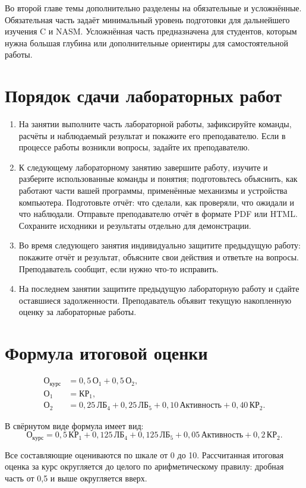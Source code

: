 Во второй главе темы дополнительно разделены на обязательные и усложнённые. Обязательная часть задаёт минимальный уровень подготовки для дальнейшего изучения C и NASM. Усложнённая часть предназначена для студентов, которым нужна большая глубина или дополнительные ориентиры для самостоятельной работы.

\section*{Порядок сдачи лабораторных работ}

\begin{enumerate}
    \item На занятии выполните часть лабораторной работы, зафиксируйте команды, расчёты и наблюдаемый результат и покажите его преподавателю. Если в процессе работы возникли вопросы, задайте их преподавателю.
    \item К следующему лабораторному занятию завершите работу, изучите и разберите использованные команды и понятия; подготовьтесь объяснить, как работают части вашей программы, применённые механизмы и устройства компьютера. Подготовьте отчёт: что сделали, как проверяли, что ожидали и что наблюдали. Отправьте преподавателю отчёт в формате PDF или HTML. Сохраните исходники и результаты отдельно для демонстрации.
    \item Во время следующего занятия индивидуально защитите предыдущую работу: покажите отчёт и результат, объясните свои действия и ответьте на вопросы. Преподаватель сообщит, если нужно что-то исправить.
    \item На последнем занятии защитите предыдущую лабораторную работу и сдайте оставшиеся задолженности. Преподаватель объявит текущую накопленную оценку за лабораторные работы.
\end{enumerate}

\section*{Формула итоговой оценки}

\begin{align*}
    \text{О}_{\text{курс}} &= 0{,}5\,\text{О}_1 + 0{,}5\,\text{О}_2,\\
    \text{О}_1 &= \text{КР}_1,\\
    \text{О}_2 &= 0{,}25\,\text{ЛБ}_4 + 0{,}25\,\text{ЛБ}_5
        + 0{,}10\,\text{Активность} + 0{,}40\,\text{КР}_2.
\end{align*}

В свёрнутом виде формула имеет вид:
\[
\text{О}_{\text{курс}} = 0{,}5\,\text{КР}_1 + 0{,}125\,\text{ЛБ}_4
    + 0{,}125\,\text{ЛБ}_5 + 0{,}05\,\text{Активность}
    + 0{,}2\,\text{КР}_2.
\]

Все составляющие оцениваются по шкале от 0 до 10. Рассчитанная итоговая оценка
за курс округляется до целого по арифметическому правилу: дробная часть от
0{,}5 и выше округляется вверх.

\tableofcontents
